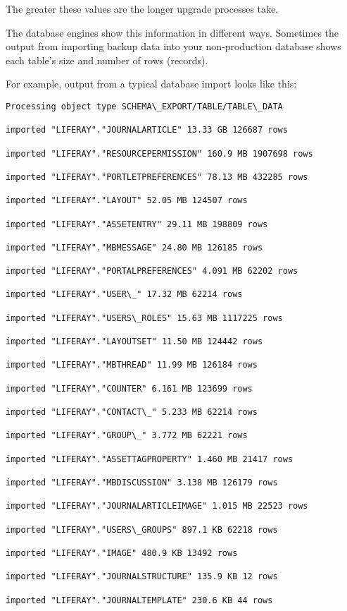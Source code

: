 The greater these values are the longer upgrade processes take.

The database engines show this information in different ways. Sometimes
the output from importing backup data into your non-production database
shows each table's size and number of rows (records).

For example, output from a typical database import looks like this:

\begin{verbatim}
Processing object type SCHEMA\_EXPORT/TABLE/TABLE\_DATA

imported "LIFERAY"."JOURNALARTICLE" 13.33 GB 126687 rows

imported "LIFERAY"."RESOURCEPERMISSION" 160.9 MB 1907698 rows

imported "LIFERAY"."PORTLETPREFERENCES" 78.13 MB 432285 rows

imported "LIFERAY"."LAYOUT" 52.05 MB 124507 rows

imported "LIFERAY"."ASSETENTRY" 29.11 MB 198809 rows

imported "LIFERAY"."MBMESSAGE" 24.80 MB 126185 rows

imported "LIFERAY"."PORTALPREFERENCES" 4.091 MB 62202 rows

imported "LIFERAY"."USER\_" 17.32 MB 62214 rows

imported "LIFERAY"."USERS\_ROLES" 15.63 MB 1117225 rows

imported "LIFERAY"."LAYOUTSET" 11.50 MB 124442 rows
 
imported "LIFERAY"."MBTHREAD" 11.99 MB 126184 rows
 
imported "LIFERAY"."COUNTER" 6.161 MB 123699 rows
 
imported "LIFERAY"."CONTACT\_" 5.233 MB 62214 rows
 
imported "LIFERAY"."GROUP\_" 3.772 MB 62221 rows

imported "LIFERAY"."ASSETTAGPROPERTY" 1.460 MB 21417 rows
 
imported "LIFERAY"."MBDISCUSSION" 3.138 MB 126179 rows
 
imported "LIFERAY"."JOURNALARTICLEIMAGE" 1.015 MB 22523 rows
 
imported "LIFERAY"."USERS\_GROUPS" 897.1 KB 62218 rows
 
imported "LIFERAY"."IMAGE" 480.9 KB 13492 rows
 
imported "LIFERAY"."JOURNALSTRUCTURE" 135.9 KB 12 rows
 
imported "LIFERAY"."JOURNALTEMPLATE" 230.6 KB 44 rows
 

\end{verbatim}
